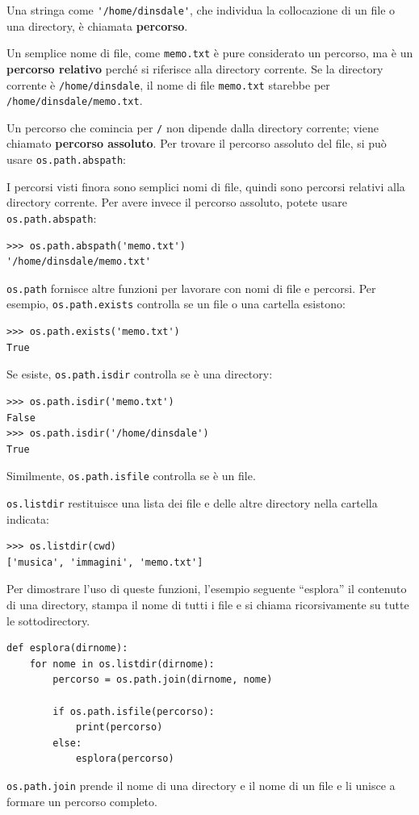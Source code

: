 \documentclass[10pt]{book}
\begin{document}
Una stringa come \verb"'/home/dinsdale'", che individua la collocazione di un file o una directory, è chiamata {\bf percorso}.

Un semplice nome di file, come {\tt memo.txt} è pure considerato un percorso,
ma è un {\bf percorso relativo} perché si riferisce alla directory corrente.  Se la directory corrente è {\tt /home/dinsdale}, il nome di file {\tt memo.txt} starebbe per {\tt /home/dinsdale/memo.txt}.

Un percorso che comincia per {\tt /} non dipende dalla directory corrente;
viene chiamato {\bf percorso assoluto}.  Per trovare il percorso assoluto del file, si può usare {\tt os.path.abspath}:

I percorsi visti finora sono semplici nomi di file, quindi sono percorsi relativi alla directory corrente. Per avere invece il percorso assoluto, potete usare {\tt os.path.abspath}:

\begin{verbatim}
>>> os.path.abspath('memo.txt')
'/home/dinsdale/memo.txt'
\end{verbatim}
%
{\tt os.path} fornisce altre funzioni per lavorare con nomi di file e percorsi. Per esempio, {\tt os.path.exists} controlla se un file o una cartella esistono:

\begin{verbatim}
>>> os.path.exists('memo.txt')
True
\end{verbatim}
%
Se esiste, {\tt os.path.isdir} controlla se è una directory:

\begin{verbatim}
>>> os.path.isdir('memo.txt')
False
>>> os.path.isdir('/home/dinsdale')
True
\end{verbatim}
%
Similmente, {\tt os.path.isfile} controlla se è un file.

{\tt os.listdir} restituisce una lista dei file e delle altre directory nella cartella indicata:

\begin{verbatim}
>>> os.listdir(cwd)
['musica', 'immagini', 'memo.txt']
\end{verbatim}
%
Per dimostrare l'uso di queste funzioni, l'esempio seguente
``esplora'' il contenuto di una directory, stampa il nome di tutti i file e si chiama ricorsivamente su tutte le sottodirectory.

\begin{verbatim}
def esplora(dirnome):
    for nome in os.listdir(dirnome):
        percorso = os.path.join(dirnome, nome)

        if os.path.isfile(percorso):
            print(percorso)
        else:
            esplora(percorso)
\end{verbatim}
%
{\tt os.path.join} prende il nome di una directory e il nome di un file e li unisce a formare un percorso completo.  
\end{document}
